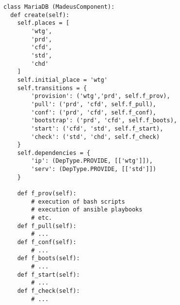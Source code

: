 \begin{lstlisting}[label=codemdb,caption=Madeus code of the MariaDB
  component type.]
class MariaDB (MadeusComponent):
  def create(self):
    self.places = [
        'wtg',
        'prd',
        'cfd',
        'std',
        'chd'
    ]
    self.initial_place = 'wtg'
    self.transitions = {
        'provision': ('wtg','prd', self.f_prov),
        'pull': ('prd', 'cfd', self.f_pull),
        'conf': ('prd', 'cfd', self.f_conf),
        'bootstrap': ('prd', 'cfd', self.f_boots),
        'start': ('cfd', 'std', self.f_start),
        'check': ('std', 'chd', self.f_check)
    }
    self.dependencies = {
        'ip': (DepType.PROVIDE, [['wtg']]),
        'serv': (DepType.PROVIDE, [['std']])
    }
    
    def f_prov(self):
        # execution of bash scripts
        # execution of ansible playbooks
        # etc.
    def f_pull(self):
        # ...
    def f_conf(self):
        # ...
    def f_boots(self):
        # ...
    def f_start(self):
        # ...
    def f_check(self):
        # ...
\end{lstlisting}
